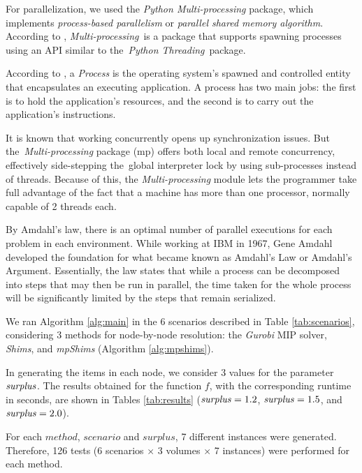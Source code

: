 \documentclass[preprint,authoryear]{elsarticle}
\begin{document}
For parallelization, we used the {\it Python Multi-processing} package, which implements {\it process-based parallelism} or {\it parallel shared memory algorithm}. According to \cite{multiprocessing}, {\it Multi-processing} is a package that supports spawning processes using an API similar to the {\it Python Threading} package.

According to \cite[p.271]{Breshears2009}, a {\it Process} is the operating system’s spawned and controlled entity that encapsulates an executing application. A process has two main jobs: the first is to hold the application's resources, and the second is to carry out the application's instructions. 

It is known that working concurrently opens up synchronization issues. But the {\it Multi-processing} package (mp) offers both local and remote concurrency, effectively side-stepping the global interpreter lock by using sub-processes instead of threads. Because of this, the {\it Multi-processing} module lets the programmer take full advantage of the fact that a machine has more than one processor, normally capable of 2 threads each.

By Amdahl's law, there is an optimal number of parallel executions for each problem in each environment. While working at IBM in 1967, Gene Amdahl developed the foundation for what became known as Amdahl's Law or Amdahl's Argument. Essentially, the law states that while a process can be decomposed into steps that may then be run in parallel, the time taken for the whole process will be significantly limited by the steps that remain serialized.

We ran Algorithm \ref{alg:main} in the 6 scenarios described in Table \ref{tab:scenarios}, considering 3 methods for node-by-node resolution: the {\it Gurobi} MIP solver, {\it Shims}, and {\it mpShims} (Algorithm \ref{alg:mpshims}).

In generating the items in each node, we consider 3 values for the parameter ${\it surplus}$. The results obtained for the function $f$, with the corresponding runtime in seconds, are shown in Tables \ref{tab:results} (${\it surplus} = 1.2$, ${\it surplus} = 1.5$, and ${\it surplus} = 2.0$).

For each $method$, $scenario$ and $surplus$, 7 different instances were generated. Therefore, 126 tests (6 scenarios $\times$ 3 volumes $\times$ 7 instances) were performed for each method. 
\end{document}
